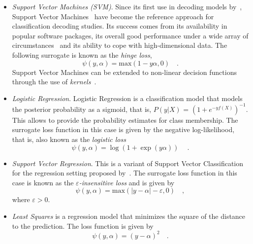 \begin{itemize}
\item {\it Support Vector Machines (SVM)}. Since its first use in decoding models by~\citet{cox2003}, Support Vector Machines~\citep{Boser:1992:TAO:130385.130401, cortes1995support} have become the reference approach for classification decoding studies. Its success comes from its availability in popular software packages, its overall good performance under a wide array of circumstances~\citep{bottou1994comparison, king1995statlog, caruana2006empirical} and its ability to cope with high-dimensional data. The following surrogate is known as the \emph{\gls{hinge loss}},
\begin{equation} \label{eq:hinge}
\psi(y, \alpha) = \text{max}(1 - y \alpha, 0) \quad .
\end{equation}
Support Vector Machines can be extended to non-linear decision functions through the use of \emph{kernels}~\citep{shawe2004kernel}.


\item {\it Logistic Regression}. Logistic Regression is a classification model that models the posterior probability as a sigmoid, that is, $P(y|X)$ = $(1 + e^{- y f(X)})^{-1}$. This allows to provide the probability estimates for class membership. The surrogate loss function in this case is given by the negative log-likelihood, that is, also known as the \emph{logistic loss}
\begin{equation}\label{eq:logistic_loss}
\psi(y, \alpha) = \log(1 + \exp({y}\alpha)) ~\quad.
\end{equation}

\item {\it Support Vector Regression}. This is a variant of Support Vector Classification for the regression setting proposed by~\citep{drucker1997support}. The surrogate loss function in this case is known as the \emph{$\varepsilon$-insensitive loss} and is given by
\begin{equation}\label{eq:svr}
\psi(y, \alpha) = \text{max}(|y - \alpha| - \varepsilon, 0) \quad ,
\end{equation}
where $\varepsilon > 0$.


\item {\it Least Squares} is a regression model that minimizes the square of the distance to the prediction. The loss function is given by 
\begin{equation}\label{eq:least_squares}
\psi(y, \alpha) = (y - \alpha)^2 \quad.
\end{equation}
\end{itemize}


